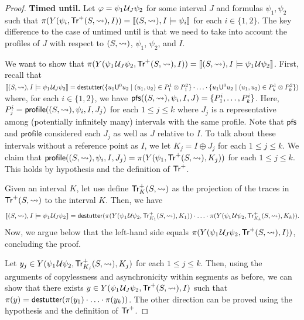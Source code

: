 \begin{proof}
	\noindent\textbf{Timed until.}
	Let $\varphi = \psi_1 \kern.1em\mathcal{U}_J \psi_2$ for some interval $J$ and formulas $\psi_1, \psi_2$ such that $\pi(Y(\psi_i, \mathsf{Tr}^+(S,{\rightsquigarrow}), I)) = \llbracket (S,{\rightsquigarrow}), I \models \psi_i \rrbracket$ for each $i \in \{1,2\}$.
	The key difference to the case of untimed until is that we need to take into account the profiles of $J$ with respect to $(S,{\rightsquigarrow})$, $\psi_1$, $\psi_2$, and $I$.
	
	We want to show that $\pi(Y(\psi_1 \kern.1em\mathcal{U}_J \psi_2, \mathsf{Tr}^+(S,{\rightsquigarrow}), I)) = \llbracket (S,{\rightsquigarrow}), I \models \psi_1 \kern.1em\mathcal{U} \psi_2 \rrbracket$.
	First, recall that $\llbracket (S,{\hb}), I \models \psi_1 \until_J \psi_2 \rrbracket = \destutter( \{ u_1 \mathsf{U}^0 u_2 \st (u_1, u_2) \in P^1_1 \otimes P^2_1 \} \cdot \ldots \cdot \{ u_1 \mathsf{U}^0 u_2 \st (u_1, u_2) \in P^1_k \otimes P^2_k \} )$ where, for each $i \in \{1,2\}$, we have $\mathsf{pfs}((S,{\rightsquigarrow}), \psi_i, I, J) = \{P^i_1, \ldots, P^i_k\}$.
	Here, $P^i_j = \mathsf{profile}((S,{\rightsquigarrow}), \psi_i, I, J_j)$ for each $1 \leq j \leq k$ where $J_j$ is a representative among (potentially infinitely many) intervals with the same profile.
	Note that $\mathsf{pfs}$ and $\mathsf{profile}$ considered each $J_j$ as well as $J$ relative to $I$.
	To talk about these intervals without a reference point as $I$, we let $K_j = I \oplus J_j$ for each $1 \leq j \leq k$.
	We claim that $\mathsf{profile}((S,{\rightsquigarrow}), \psi_i, I, J_j) = \pi(Y(\psi_1, \mathsf{Tr}^+(S,{\rightsquigarrow}), K_j))$ for each $1 \leq j \leq k$.
	This holds by hypothesis and the definition of $\mathsf{Tr}^+$.
	
	Given an interval $K$, let use define $\mathsf{Tr}^+_K(S,{\rightsquigarrow})$ as the projection of the traces in $\mathsf{Tr}^+(S,{\rightsquigarrow})$ to the interval $K$.
	Then, we have
	\[ \llbracket (S,{\rightsquigarrow}), I \models \psi_1 \kern.1em\mathcal{U}_J \psi_2 \rrbracket = \mathsf{destutter}( \pi(Y(\psi_1 \kern.1em\mathcal{U} \psi_2, \mathsf{Tr}^+_{K_1}(S,{\rightsquigarrow}), K_1)) \cdot \ldots \cdot \pi(Y(\psi_1 \kern.1em\mathcal{U} \psi_2, \mathsf{Tr}^+_{K_k}(S,{\rightsquigarrow}), K_k)).	\]
	Now, we argue below that the left-hand side equals $\pi(Y(\psi_1 \kern.1em\mathcal{U}_J \psi_2, \mathsf{Tr}^+(S,{\rightsquigarrow}), I ))$, concluding the proof.

	Let $y_j \in Y(\psi_1 \kern.1em\mathcal{U} \psi_2, \mathsf{Tr}^+_{K_j}(S,{\rightsquigarrow}), K_j)$ for each $1 \leq j \leq k$.
	Then, using the arguments of copylessness and asynchronicity within segments as before, we can show that there exists $y \in Y(\psi_1 \kern.1em\mathcal{U}_J \psi_2, \mathsf{Tr}^+(S,{\rightsquigarrow}), I)$ such that $\pi(y) = \mathsf{destutter}( \pi(y_1) \cdot \ldots \cdot \pi(y_k) )$.
	The other direction can be proved using the hypothesis and the definition of $\mathsf{Tr}^+$.
%	
\end{proof}


